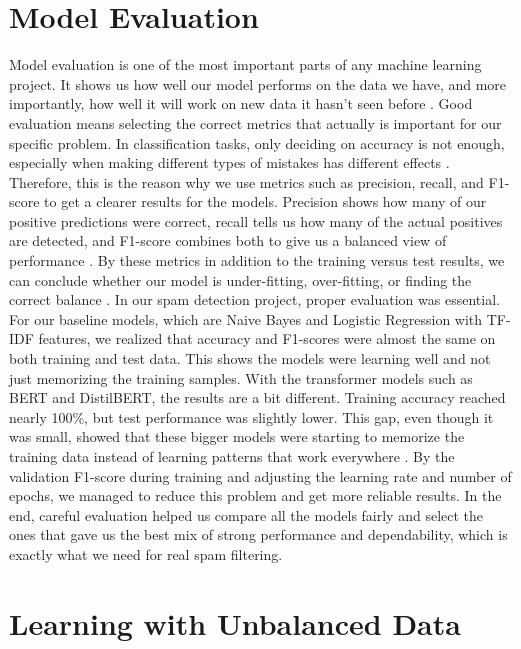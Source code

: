 \documentclass[11pt]{article}
\begin{document}
\section{Model Evaluation}
Model evaluation is one of the most important parts of any machine learning project. It shows us how well our model performs on the data we have, and more importantly, how well it will work on new data it hasn't seen before \cite{hastie2009elements}. Good evaluation means selecting the correct metrics that actually is important for our specific problem. In classification tasks, only deciding on accuracy is not enough, especially when making different types of mistakes has different effects \cite{sokolova2009systematic}. Therefore, this is the reason why we use metrics such as precision, recall, and F1-score to get a clearer results for the models. Precision shows how many of our positive predictions were correct, recall tells us how many of the actual positives are detected, and F1-score combines both to give us a balanced view of performance \cite{powers2020evaluation}. By these metrics in addition to the training versus test results, we can conclude whether our model is under-fitting, over-fitting, or finding the correct balance \cite{japkowicz2011evaluating}.  In our spam detection project, proper evaluation was essential. For our baseline models, which are Naive Bayes and Logistic Regression with TF-IDF features, we realized that accuracy and F1-scores were almost the same on both training and test data. This shows the models were learning well and not just memorizing the training samples. With the transformer models such as BERT and DistilBERT, the results are a bit different. Training accuracy reached nearly 100\%, but test performance was slightly lower. This gap, even though it was small, showed that these bigger models were starting to memorize the training data instead of learning patterns that work everywhere \cite{devlin2019bert, sanh2019distilbert}. By the validation F1-score during training and adjusting the learning rate and number of epochs, we managed to reduce this problem and get more reliable results. In the end, careful evaluation helped us compare all the models fairly and select the ones that gave us the best mix of strong performance and dependability, which is exactly what we need for real spam filtering\cite{shazad2024spam}. 

\section{Learning with Unbalanced Data}
\end{document}
